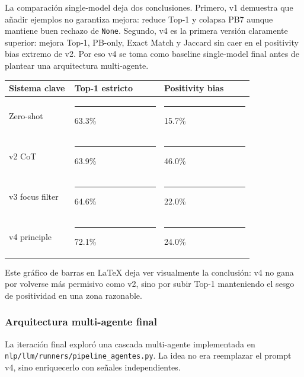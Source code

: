 La comparación single-model deja dos conclusiones. Primero, v1 demuestra que añadir ejemplos no garantiza mejora: reduce Top-1 y colapsa PB7 aunque mantiene buen rechazo de \texttt{None}. Segundo, v4 es la primera versión claramente superior: mejora Top-1, PB-only, Exact Match y Jaccard sin caer en el positivity bias extremo de v2. Por eso v4 se toma como baseline single-model final antes de plantear una arquitectura multi-agente.

\begin{center}
\scriptsize
\setlength{\tabcolsep}{5pt}
\renewcommand{\arraystretch}{1.2}
\begin{tabular}{p{0.22\linewidth}p{0.30\linewidth}p{0.30\linewidth}}
\toprule
Sistema clave & Top-1 estricto & Positivity bias \\
\midrule
Zero-shot & \rule{3.08cm}{0.8ex} 63.3\% & \rule{0.85cm}{0.8ex} 15.7\% \\
v2 CoT & \rule{3.11cm}{0.8ex} 63.9\% & \rule{2.50cm}{0.8ex} 46.0\% \\
v3 focus filter & \rule{3.14cm}{0.8ex} 64.6\% & \rule{1.20cm}{0.8ex} 22.0\% \\
v4 principle & \rule{3.50cm}{0.8ex} 72.1\% & \rule{1.30cm}{0.8ex} 24.0\% \\
\bottomrule
\end{tabular}
\end{center}

Este gráfico de barras en LaTeX deja ver visualmente la conclusión: v4 no gana por volverse más permisivo como v2, sino por subir Top-1 manteniendo el sesgo de positividad en una zona razonable.

\subsubsection*{Arquitectura multi-agente final}

La iteración final exploró una cascada multi-agente implementada en \texttt{nlp/llm/runners/pipeline\_agentes.py}. La idea no era reemplazar el prompt v4, sino enriquecerlo con señales independientes.



